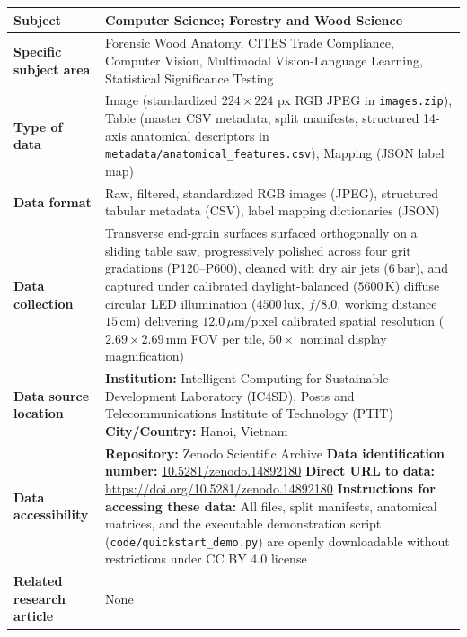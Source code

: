\documentclass[a4paper,fleqn,12pt]{cas-sc}
\begin{document}
\begin{tabularx}{\linewidth}{@{} l X @{}}
\toprule
\textbf{Subject} & Computer Science; Forestry and Wood Science \\
\midrule
\textbf{Specific subject area} & Forensic Wood Anatomy, CITES Trade Compliance, Computer Vision, Multimodal Vision-Language Learning, Statistical Significance Testing \\
\midrule
\textbf{Type of data} & Image (standardized $224 \times 224$ px RGB JPEG in \texttt{images.zip}), Table (master CSV metadata, split manifests, structured 14-axis anatomical descriptors in \texttt{metadata/anatomical\_features.csv}), Mapping (JSON label map) \\
\midrule
\textbf{Data format} & Raw, filtered, standardized RGB images (JPEG), structured tabular metadata (CSV), label mapping dictionaries (JSON) \\
\midrule
\textbf{Data collection} & Transverse end-grain surfaces surfaced orthogonally on a sliding table saw, progressively polished across four grit gradations (P120--P600), cleaned with dry air jets ($6\,\text{bar}$), and captured under calibrated daylight-balanced ($5600\,\text{K}$) diffuse circular LED illumination ($4500\,\text{lux}$, $f/8.0$, working distance $15\,\text{cm}$) delivering $12.0\,\mu\text{m/pixel}$ calibrated spatial resolution ($2.69 \times 2.69\,\text{mm}$ FOV per tile, $50\times$ nominal display magnification) \\
\midrule
\textbf{Data source location} & \textbf{Institution:} Intelligent Computing for Sustainable Development Laboratory (IC4SD), Posts and Telecommunications Institute of Technology (PTIT) \newline
\textbf{City/Country:} Hanoi, Vietnam \\
\midrule
\textbf{Data accessibility} & \textbf{Repository:} Zenodo Scientific Archive \newline
\textbf{Data identification number:} \href{https://doi.org/10.5281/zenodo.14892180}{10.5281/zenodo.14892180} \newline
\textbf{Direct URL to data:} \url{https://doi.org/10.5281/zenodo.14892180} \newline
\textbf{Instructions for accessing these data:} All files, split manifests, anatomical matrices, and the executable demonstration script (\texttt{code/quickstart\_demo.py}) are openly downloadable without restrictions under CC BY 4.0 license \\
\midrule
\textbf{Related research article} & None \\
\bottomrule
\end{tabularx}
\end{document}
